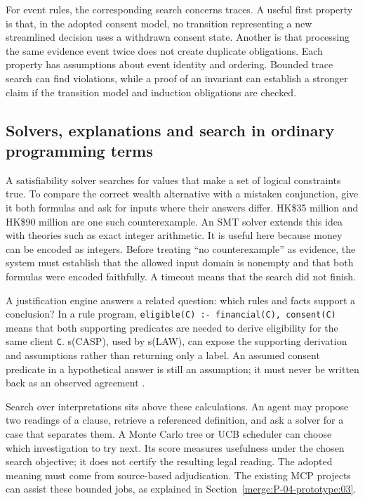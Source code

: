 \documentclass[12pt,a4paper,oneside,openany]{book}
\begin{document}
For event rules, the corresponding search concerns traces. A useful first
property is that, in the adopted consent model, no transition representing a new
streamlined decision uses a withdrawn consent state. Another is that processing
the same evidence event twice does not create duplicate obligations. Each
property has assumptions about event identity and ordering. Bounded trace search
can find violations, while a proof of an invariant can establish a stronger
claim if the transition model and induction obligations are checked.

\subsection{Solvers, explanations and search in ordinary programming terms}
\label{merge:P-01a-language-lesson:05}


A satisfiability solver searches for values that make a set of logical
constraints true. To compare the correct wealth alternative with a mistaken
conjunction, give it both formulas and ask for inputs where their answers differ.
HK\$35 million and HK\$90 million are one such counterexample. An SMT solver
extends this idea with theories such as exact integer arithmetic. It is useful
here because money can be encoded as integers. Before treating ``no
counterexample'' as evidence, the system must establish that the allowed input
domain is nonempty and that both formulas were encoded faithfully. A timeout
means that the search did not finish.

A justification engine answers a related question: which rules and facts support
a conclusion? In a rule program, \texttt{eligible(C) :- financial(C), consent(C)}
means that both supporting predicates are needed to derive eligibility for the
same client \texttt{C}. s(CASP), used by s(LAW), can expose the supporting
derivation and assumptions rather than returning only a label. An assumed
consent predicate in a hypothetical answer is still an assumption; it must never
be written back as an observed agreement \citep{slaw2024}.

Search over interpretations sits above these calculations. An agent may propose
two readings of a clause, retrieve a referenced definition, and ask a solver for
a case that separates them. A Monte Carlo tree or UCB scheduler can choose which
investigation to try next. Its score measures usefulness under the chosen search
objective; it does not certify the resulting legal reading. The adopted meaning
must come from source-based adjudication. The existing MCP projects can assist
these bounded jobs, as explained in Section~\ref{merge:P-04-prototype:03}.
\end{document}
